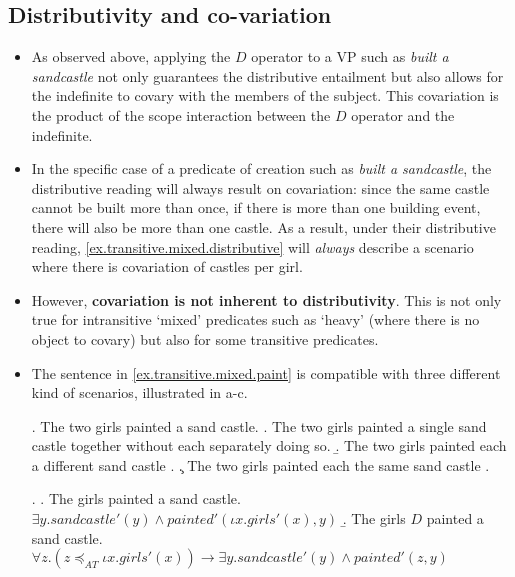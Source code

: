 \documentclass[a4paper]{article}
\newcommand{\addMM}[1]{{\leavevmode\color{red}#1}}
\begin{document}
\subsection{Distributivity and co-variation}


\begin{itemize}
\item As observed above, applying the $D$ operator to a VP such as \textit{built a sandcastle} not only guarantees the distributive entailment but also allows for the indefinite to covary with the members of the subject. This covariation is the product of the scope interaction between the $D$ operator and the indefinite. 

\item In the specific case of a predicate of creation such as \textit{built a sandcastle}, the distributive reading will always result on covariation: since the same castle cannot be built more than once, if there is more than one building event, there will also be more than one castle. As a result, under their distributive reading, \ref{ex.transitive.mixed.distributive} will \emph{always} describe a scenario where there is covariation of castles per girl. 

\item However, \textbf{covariation is not inherent to distributivity}. This is not only true for intransitive `mixed' predicates such as `heavy' (where there is no object to covary) but also for some transitive predicates. 

\item The sentence in \ref{ex.transitive.mixed.paint} is compatible with three different kind of scenarios, illustrated in a-c. 

\ex. The two girls painted a sand castle. \label{ex.transitive.mixed.paint}
\a. The two girls painted a single sand castle together without each separately doing so. 
\b.  The two girls painted each a different sand castle .
\c. The two girls painted each the same sand castle .

\ex. \label{ex.transitive.mixed.paint.LF}
\a. The girls painted a sand castle.\\
        $\exists y.\mathit{sandcastle}'(y) \wedge \textit{painted}'(\iota x.\mathit{girls}'(x), y)$
\b. The girls $D$ painted a sand castle.\\
    $\forall z . (z\preceq_{AT} \iota x.\mathit{girls}'(x)) \rightarrow \exists y.\mathit{sand castle}'(y) \wedge \textit{painted}'(z,y)$
    

\end{itemize}
\end{document}
